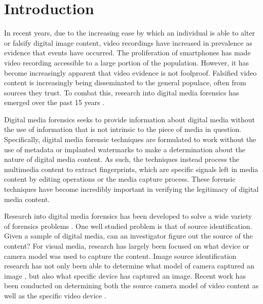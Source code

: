 \chapter{Introduction}

In recent years, due to the increasing ease by which an individual is able to alter or falsify digital image content, video recordings have increased in prevalence as evidence that events have occurred. The proliferation of smartphones has made video recording accessible to a large portion of the population. However, it has become increasingly apparent that video evidence is not foolproof. Falsified video content is increasingly being disseminated to the general populace, often from sources they trust. To combat this, research into digital media forensics has emerged over the past 15 years \cite{A}.

Digital media forensics seeks to provide information about digital media without the use of information that is not intrinsic to the piece of media in question. Specifically, digital media forensic techniques are formulated to work without the use of metadata or implanted watermarks to make a determination about the nature of digital media content. As such, the techniques instead process the multimedia content to extract fingerprints, which are specific signals left in media content by editing operations or the media capture process. These forensic techniques have become incredibly important in verifying the legitimacy of digital media content.

Research into digital media forensics has been developed to solve a wide variety of forensics problems \cite{A} \cite{B} \cite{D}. One well studied problem is that of source identification. Given a sample of digital media, can an investigator figure out the source of the content? For visual media, research has largely been focused on what device or camera model was used to capture the content. Image source identification research has not only been able to determine what model of camera captured an image \cite{imagesourceid, E, F, G, H, I, J, K, L, M}, but also what specific device \cite{prnu, N, O, P} has captured an image. Recent work has been conducted on determining both the source camera model of video content \cite{videosourceid} as well as the specific video device \cite{Q} \cite{R}.

